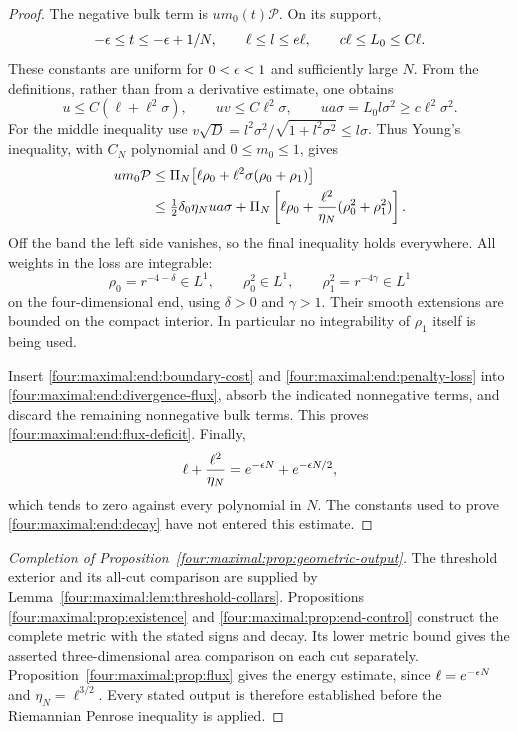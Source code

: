 \begin{proof}
The negative bulk term is $um_0(t)\mathcal P$.  On its support,
\[
 -\epsilon\le t\le-\epsilon+1/N,
 \qquad \ell\le l\le e\ell,\qquad c\ell\le L_0\le C\ell.
\]
These constants are uniform for $0<\epsilon<1$ and sufficiently large
$N$.  From the definitions, rather than from a derivative estimate,
one obtains
\begin{equation}\label{four:maximal:end:band-identities}
 u\le C(\ell+\ell^2\sigma),\qquad
 uv\le C\ell^2\sigma,\qquad
 ua\sigma=L_0l\sigma^2\ge c\ell^2\sigma^2.
\end{equation}
For the middle inequality use
$v\sqrt D=l^2\sigma^2/\sqrt{1+l^2\sigma^2}\le l\sigma$.
Thus Young's inequality, with $C_N$ polynomial and $0\le m_0\le1$,
gives
\begin{align}\label{four:maximal:end:penalty-loss}
 um_0\mathcal P
 &\le \Pi_N\bigl[\ell\rho_0+
                         \ell^2\sigma(\rho_0+\rho_1)\bigr]\notag\\
 &\le\tfrac12\delta_0\eta_N ua\sigma
       +\Pi_N\left[\ell\rho_0+
                  \frac{\ell^2}{\eta_N}(\rho_0^2+\rho_1^2)\right].
\end{align}
Off the band the left side vanishes, so the final inequality holds
everywhere.  All weights in the loss are integrable:
\[
 \rho_0=r^{-4-\delta}\in L^1,\qquad
 \rho_0^2\in L^1,\qquad
 \rho_1^2=r^{-4\gamma}\in L^1
\]
on the four-dimensional end, using $\delta>0$ and $\gamma>1$.
Their smooth extensions are bounded on the compact interior.  In
particular no integrability of $\rho_1$ itself is being used.

Insert \eqref{four:maximal:end:boundary-cost} and \eqref{four:maximal:end:penalty-loss} into
\eqref{four:maximal:end:divergence-flux}, absorb the indicated nonnegative terms,
and discard the remaining nonnegative bulk terms.  This proves
\eqref{four:maximal:end:flux-deficit}.  Finally,
\[
 \ell+\frac{\ell^2}{\eta_N}
       =e^{-\epsilon N}+e^{-\epsilon N/2},
\]
which tends to zero against every polynomial in $N$.  The constants
used to prove \eqref{four:maximal:end:decay} have not entered this estimate.
\end{proof}

\begin{proof}[Completion of Proposition~\ref{four:maximal:prop:geometric-output}]
The threshold exterior and its all-cut comparison are supplied by
Lemma~\ref{four:maximal:lem:threshold-collars}.  Propositions~
\ref{four:maximal:prop:existence} and \ref{four:maximal:prop:end-control}
construct the complete metric with the stated signs and decay.
Its lower metric bound gives the asserted three-dimensional area
comparison on each cut separately.  Proposition~\ref{four:maximal:prop:flux}
gives the energy estimate, since $\ell=e^{-\epsilon N}$ and
$\eta_N=\ell^{3/2}$.  Every stated output is therefore established
before the Riemannian Penrose inequality is applied.
\end{proof}

